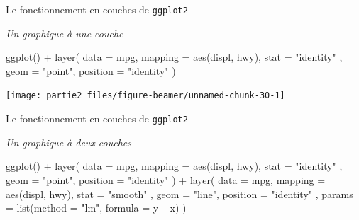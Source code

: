 \documentclass[12pt,ignorenonframetext,]{beamer}
\newenvironment{Shaded}{}{}
\newcommand{\KeywordTok}[1]{\textcolor[rgb]{0.00,0.00,1.00}{#1}}
\newcommand{\DataTypeTok}[1]{#1}
\newcommand{\StringTok}[1]{\textcolor[rgb]{0.00,0.50,0.50}{#1}}
\newcommand{\OperatorTok}[1]{#1}
\newcommand{\NormalTok}[1]{#1}
\renewenvironment{Shaded}{\begin{snugshade}}{\end{snugshade}}
\begin{document}
\begin{frame}[fragile]{\large Le fonctionnement en \og couches \fg{} de
\texttt{ggplot2}}

\emph{Un graphique à une couche}

\footnotesize \centering

\begin{Shaded}
\begin{Highlighting}[]
\KeywordTok{ggplot}\NormalTok{() }\OperatorTok{+}\StringTok{ }\KeywordTok{layer}\NormalTok{(}
  \DataTypeTok{data =}\NormalTok{ mpg, }\DataTypeTok{mapping =} \KeywordTok{aes}\NormalTok{(displ, hwy), }\DataTypeTok{stat =} \StringTok{"identity"}
\NormalTok{  , }\DataTypeTok{geom =} \StringTok{"point"}\NormalTok{, }\DataTypeTok{position =} \StringTok{"identity"}
\NormalTok{)}
\end{Highlighting}
\end{Shaded}

\texttt{[image: partie2\_files/figure-beamer/unnamed-chunk-30-1]}

\end{frame}

\begin{frame}[fragile]{\large Le fonctionnement en \og couches \fg{} de
\texttt{ggplot2}}

\emph{Un graphique à deux couches}

\footnotesize \centering

\begin{Shaded}
\begin{Highlighting}[]
\KeywordTok{ggplot}\NormalTok{() }\OperatorTok{+}\StringTok{ }\KeywordTok{layer}\NormalTok{(}
  \DataTypeTok{data =}\NormalTok{ mpg, }\DataTypeTok{mapping =} \KeywordTok{aes}\NormalTok{(displ, hwy), }\DataTypeTok{stat =} \StringTok{"identity"}
\NormalTok{  , }\DataTypeTok{geom =} \StringTok{"point"}\NormalTok{, }\DataTypeTok{position =} \StringTok{"identity"}
\NormalTok{) }\OperatorTok{+}\StringTok{ }\KeywordTok{layer}\NormalTok{(}
  \DataTypeTok{data =}\NormalTok{ mpg, }\DataTypeTok{mapping =} \KeywordTok{aes}\NormalTok{(displ, hwy), }\DataTypeTok{stat =} \StringTok{"smooth"}
\NormalTok{  , }\DataTypeTok{geom =} \StringTok{"line"}\NormalTok{, }\DataTypeTok{position =} \StringTok{"identity"}
\NormalTok{  , }\DataTypeTok{params =} \KeywordTok{list}\NormalTok{(}\DataTypeTok{method =} \StringTok{"lm"}\NormalTok{, }\DataTypeTok{formula =}\NormalTok{ y }\OperatorTok{~}\StringTok{ }\NormalTok{x)}
\NormalTok{)}
\end{Highlighting}
\end{Shaded}

\vfill

\vfill

\end{frame}
\end{document}
